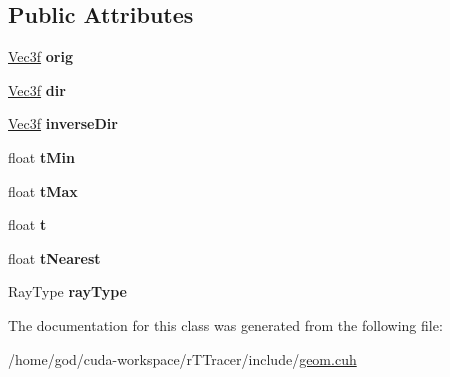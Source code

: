 \subsection*{Public Attributes}
\begin{DoxyCompactItemize}
\item 
\hyperlink{class_vec3}{Vec3f} {\bfseries orig}\hypertarget{class_ray_a83060ce4752b7178322491c3ba060aeb}{}\label{class_ray_a83060ce4752b7178322491c3ba060aeb}

\item 
\hyperlink{class_vec3}{Vec3f} {\bfseries dir}\hypertarget{class_ray_abb6aec8e6d0ce79e31ccaf7cc0bd2f5e}{}\label{class_ray_abb6aec8e6d0ce79e31ccaf7cc0bd2f5e}

\item 
\hyperlink{class_vec3}{Vec3f} {\bfseries inverse\+Dir}\hypertarget{class_ray_a4aeb023e811e12834cb8e1daaf1e3db4}{}\label{class_ray_a4aeb023e811e12834cb8e1daaf1e3db4}

\item 
float {\bfseries t\+Min}\hypertarget{class_ray_a79bb8e0202bc33a3035b59b0cc25716d}{}\label{class_ray_a79bb8e0202bc33a3035b59b0cc25716d}

\item 
float {\bfseries t\+Max}\hypertarget{class_ray_a02e897e4b9c32cf86b7a28b44655b991}{}\label{class_ray_a02e897e4b9c32cf86b7a28b44655b991}

\item 
float {\bfseries t}\hypertarget{class_ray_a4ec5a9098b620bda59d15b0a4f99d454}{}\label{class_ray_a4ec5a9098b620bda59d15b0a4f99d454}

\item 
float {\bfseries t\+Nearest}\hypertarget{class_ray_ac729496eee350d328c4bff50b8235baf}{}\label{class_ray_ac729496eee350d328c4bff50b8235baf}

\item 
Ray\+Type {\bfseries ray\+Type}\hypertarget{class_ray_a53798941244349eeb1b61d9a3cef8425}{}\label{class_ray_a53798941244349eeb1b61d9a3cef8425}

\end{DoxyCompactItemize}


The documentation for this class was generated from the following file\+:\begin{DoxyCompactItemize}
\item 
/home/god/cuda-\/workspace/r\+T\+Tracer/include/\hyperlink{geom_8cuh}{geom.\+cuh}\end{DoxyCompactItemize}
